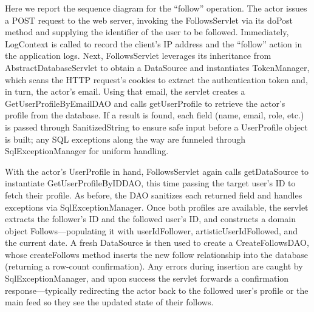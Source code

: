 Here we report the sequence diagram for the “follow” operation. The actor issues a POST request to the web server, invoking the FollowsServlet via its doPost method and supplying the identifier of the user to be followed. Immediately, LogContext is called to record the client’s IP address and the “follow” action in the application logs. Next, FollowsServlet leverages its inheritance from AbstractDatabaseServlet to obtain a DataSource and instantiates TokenManager, which scans the HTTP request’s cookies to extract the authentication token and, in turn, the actor’s email. Using that email, the servlet creates a GetUserProfileByEmailDAO and calls getUserProfile to retrieve the actor’s profile from the database. If a result is found, each field (name, email, role, etc.) is passed through SanitizedString to ensure safe input before a UserProfile object is built; any SQL exceptions along the way are funneled through SqlExceptionManager for uniform handling.

With the actor’s UserProfile in hand, FollowsServlet again calls getDataSource to instantiate GetUserProfileByIDDAO, this time passing the target user’s ID to fetch their profile. As before, the DAO sanitizes each returned field and handles exceptions via SqlExceptionManager. Once both profiles are available, the servlet extracts the follower’s ID and the followed user’s ID, and constructs a domain object Follows—populating it with userIdFollower, artisticUserIdFollowed, and the current date. A fresh DataSource is then used to create a CreateFollowsDAO, whose createFollows method inserts the new follow relationship into the database (returning a row‑count confirmation). Any errors during insertion are caught by SqlExceptionManager, and upon success the servlet forwards a confirmation response—typically redirecting the actor back to the followed user’s profile or the main feed so they see the updated state of their follows.